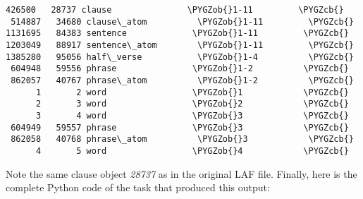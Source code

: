 \documentclass[letterpaper,10pt,english]{sphinxmanual}
\def\PYGZob{\char`\{}
\def\PYGZcb{\char`\}}
\begin{document}
\begin{Verbatim}[commandchars=\\\{\}]
 426500   28737 clause               \PYGZob{}1-11         \PYGZcb{}
 514887   34680 clause\_atom          \PYGZob{}1-11         \PYGZcb{}
1131695   84383 sentence             \PYGZob{}1-11         \PYGZcb{}
1203049   88917 sentence\_atom        \PYGZob{}1-11         \PYGZcb{}
1385280   95056 half\_verse           \PYGZob{}1-4          \PYGZcb{}
 604948   59556 phrase               \PYGZob{}1-2          \PYGZcb{}
 862057   40767 phrase\_atom          \PYGZob{}1-2          \PYGZcb{}
      1       2 word                 \PYGZob{}1            \PYGZcb{}
      2       3 word                 \PYGZob{}2            \PYGZcb{}
      3       4 word                 \PYGZob{}3            \PYGZcb{}
 604949   59557 phrase               \PYGZob{}3            \PYGZcb{}
 862058   40768 phrase\_atom          \PYGZob{}3            \PYGZcb{}
      4       5 word                 \PYGZob{}4            \PYGZcb{}
\end{Verbatim}

Note the same clause object \emph{28737} as in the original LAF file.
Finally, here is the complete Python code of the task that produced this output:
\end{document}
